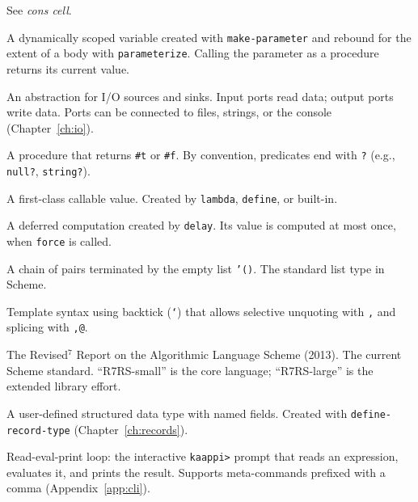 \begin{description}[leftmargin=2em, style=nextline]
\item[pair]
See \emph{cons cell}.

\item[parameter object]
A dynamically scoped variable created with \texttt{make-parameter} and rebound for the extent of a body with \texttt{parameterize}. Calling the parameter as a procedure returns its current value.

\item[port]
An abstraction for I/O sources and sinks. Input ports read data; output ports write data. Ports can be connected to files, strings, or the console (Chapter~\ref{ch:io}).

\item[predicate]
A procedure that returns \texttt{\#t} or \texttt{\#f}. By convention, predicates end with \texttt{?} (e.g., \texttt{null?}, \texttt{string?}).

\item[procedure]
A first-class callable value. Created by \texttt{lambda}, \texttt{define}, or built-in.

\item[promise]
A deferred computation created by \texttt{delay}. Its value is computed at most once, when \texttt{force} is called.

\item[proper list]
A chain of pairs terminated by the empty list \texttt{'()}. The standard list type in Scheme.

\item[quasiquote]
Template syntax using backtick (\texttt{`}) that allows selective unquoting with \texttt{,} and splicing with \texttt{,@}.

\item[R7RS]
The Revised$^7$ Report on the Algorithmic Language Scheme (2013). The current Scheme standard. ``R7RS-small'' is the core language; ``R7RS-large'' is the extended library effort.

\item[record]
A user-defined structured data type with named fields. Created with \texttt{define-record-type} (Chapter~\ref{ch:records}).

\item[REPL]
Read-eval-print loop: the interactive \texttt{kaappi>} prompt that reads an expression, evaluates it, and prints the result. Supports meta-commands prefixed with a comma (Appendix~\ref{app:cli}).


\end{description}

